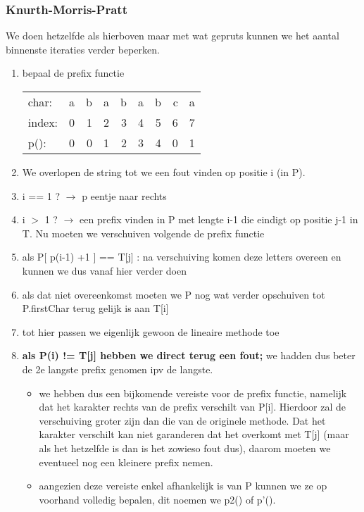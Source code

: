 \subsubsection{Knurth-Morris-Pratt}
We doen hetzelfde als hierboven maar met wat gepruts kunnen we het aantal binnenste iteraties verder beperken.
\begin{enumerate}
\item bepaal de prefix functie
\begin{tabular}{lrrrrrrrr}
char: &a &b &a &b &a &b &c &a \\
index:&0 &1 &2 &3 &4 &5 &6 &7 \\
p():  &0 &0 &1 &2 &3 &4 &0 &1
\end{tabular}
\item We overlopen de string tot we een fout vinden op positie i (in P).
\item i == 1 ? $\rightarrow$ p eentje naar rechts
\item i $>$ 1  ? $\rightarrow$ een prefix vinden in P met lengte i-1 die eindigt op positie j-1 in T. Nu moeten we verschuiven volgende de prefix functie
\item als P[ p(i-1) +1 ] == T[j] : na verschuiving komen deze letters overeen en kunnen we dus vanaf hier verder doen
\item als dat niet overeenkomst moeten we P nog wat verder opschuiven tot P.firstChar terug gelijk is aan T[i]
\item tot hier passen we eigenlijk gewoon de lineaire methode toe

\item \textbf{als P(i) != T[j] hebben we direct terug een fout;} we hadden dus beter de 2e langste prefix genomen ipv de langste.
\begin{itemize}
\item we hebben dus een bijkomende vereiste voor de prefix functie, namelijk dat het karakter rechts van de prefix verschilt van P[i]. Hierdoor zal de verschuiving groter zijn dan die van de originele methode. Dat het karakter verschilt kan niet garanderen dat het overkomt met T[j] (maar als het hetzelfde is dan is het zowieso fout dus), daarom moeten we eventueel nog een kleinere prefix nemen.
\item aangezien deze vereiste enkel afhankelijk is van P kunnen we ze op voorhand volledig bepalen, dit noemen we p2() of p'().
\end{itemize}


\end{enumerate}
